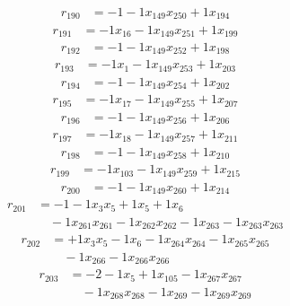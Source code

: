 \[\begin{aligned}
r_{190} &= - 1 - 1 x_{149} x_{250} + 1 x_{194}
\end{aligned}\]
\[\begin{aligned}
r_{191} &= - 1 x_{16} - 1 x_{149} x_{251} + 1 x_{199}
\end{aligned}\]
\[\begin{aligned}
r_{192} &= - 1 - 1 x_{149} x_{252} + 1 x_{198}
\end{aligned}\]
\[\begin{aligned}
r_{193} &= - 1 x_{1} - 1 x_{149} x_{253} + 1 x_{203}
\end{aligned}\]
\[\begin{aligned}
r_{194} &= - 1 - 1 x_{149} x_{254} + 1 x_{202}
\end{aligned}\]
\[\begin{aligned}
r_{195} &= - 1 x_{17} - 1 x_{149} x_{255} + 1 x_{207}
\end{aligned}\]
\[\begin{aligned}
r_{196} &= - 1 - 1 x_{149} x_{256} + 1 x_{206}
\end{aligned}\]
\[\begin{aligned}
r_{197} &= - 1 x_{18} - 1 x_{149} x_{257} + 1 x_{211}
\end{aligned}\]
\[\begin{aligned}
r_{198} &= - 1 - 1 x_{149} x_{258} + 1 x_{210}
\end{aligned}\]
\[\begin{aligned}
r_{199} &= - 1 x_{103} - 1 x_{149} x_{259} + 1 x_{215}
\end{aligned}\]
\[\begin{aligned}
r_{200} &= - 1 - 1 x_{149} x_{260} + 1 x_{214}
\end{aligned}\]
\[\begin{aligned}
r_{201} &= - 1 - 1 x_{3} x_{5} + 1 x_{5} + 1 x_{6} \\
 &\quad - 1 x_{261} x_{261} - 1 x_{262} x_{262} - 1 x_{263} - 1 x_{263} x_{263}
\end{aligned}\]
\[\begin{aligned}
r_{202} &= + 1 x_{3} x_{5} - 1 x_{6} - 1 x_{264} x_{264} - 1 x_{265} x_{265} \\
 &\quad - 1 x_{266} - 1 x_{266} x_{266}
\end{aligned}\]
\[\begin{aligned}
r_{203} &= - 2 - 1 x_{5} + 1 x_{105} - 1 x_{267} x_{267} \\
 &\quad - 1 x_{268} x_{268} - 1 x_{269} - 1 x_{269} x_{269}
\end{aligned}\]
